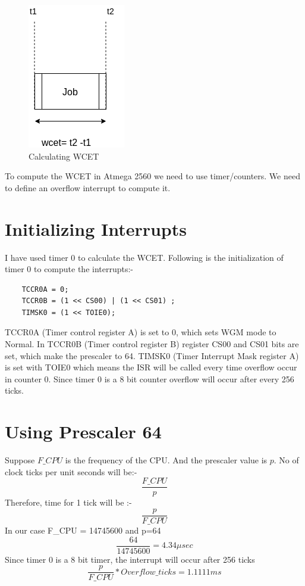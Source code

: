 \documentclass[16pt]{report}
\begin{document}
\begin{figure}[H]
\centering
\includegraphics[width=0.3\linewidth]{17wcet.png}
\caption{Calculating WCET}
\end{figure}

To compute the WCET in Atmega 2560 we need to use timer/counters. We need to define an overflow interrupt to compute it. 

\section{Initializing Interrupts}
I have used timer 0 to calculate the WCET. Following is the initialization of timer 0 to compute the interrupts:-\\
\begin{verbatim}
    TCCR0A = 0;
    TCCR0B = (1 << CS00) | (1 << CS01) ;
    TIMSK0 = (1 << TOIE0);
\end{verbatim}

TCCR0A (Timer control register A) is set to 0, which sets WGM mode to Normal. In TCCR0B (Timer control register B) register CS00 and CS01 bits are set, which make the prescaler to 64. TIMSK0 (Timer Interrupt Mask register A) is set with TOIE0 which means the ISR will be called every time overflow occur in counter 0. Since timer 0 is a 8 bit counter overflow will occur after every 256 ticks.\\

\section{Using Prescaler 64}
Suppose $F\_CPU$ is the frequency of the CPU. And the prescaler value is $p$.
No of clock ticks per unit seconds will be:-
\begin{equation}
    \frac{F\_CPU}{p}
\end{equation}
Therefore, time for 1 tick will be :-
\begin{equation}
    \frac{p}{F\_CPU}
\end{equation}
In our case F\_CPU = 14745600 and p=64
\begin{equation}
    \frac{64}{14745600} = 4.34 \mu sec
\end{equation}
Since timer 0 is a 8 bit timer, the interrupt will occur after 256 ticks\\
\begin{equation}
    \frac{p}{F\_CPU}*Overflow\_ticks = 1.1111 ms
\end{equation}
\end{document}
